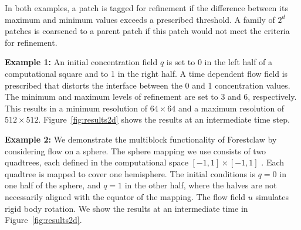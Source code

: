 \documentclass{IOS-Book-Article}     %
\newcommand{\forestclaw}{Forestclaw\xspace}
\newcommand{\plotbox}[1]{#1}
\newcommand{\Fig}[1]{Figure~\ref{fig:#1}}
\begin{document}
In both examples, a patch is tagged for refinement if the
difference between its maximum and minimum values exceeds a prescribed
threshold.  A family of $2^d$ patches is coarsened to a parent patch
if this patch would not meet the criteria for refinement.

\begin{description}
\item{\bf Example 1:} An initial concentration field $q$
is set to 0 in the left half of a computational square and to 1 in the
right half.  A time dependent flow field is prescribed that distorts
the interface between the 0 and 1 concentration values.  The minimum
and maximum levels of refinement are set to 3 and 6, respectively.
This results in a minimum resolution of $64 \times 64$ and a maximum
resolution of $512 \times 512$.  \Fig{results2d} shows the results
at an intermediate time step.


\item{\bf Example 2:} We demonstrate the
multiblock functionality of \forestclaw by considering flow on a
sphere.  The sphere mapping we use consists of two quadtrees, each
defined in the computational space $[-1,1] \times [-1,1]$
\cite{ca-he-le:2008, be-ca-he-le:2009}.  Each quadtree is mapped to cover one
hemisphere.  The initial conditions is $q = 0$ in one half of
the sphere, and $q = 1$ in the other half, where the halves are not
necessarily aligned with the equator of the mapping.  The flow field
${u}$ simulates rigid body rotation.  We show the results at an intermediate
time in \Fig{results2d}.
\end{description}
\end{document}
